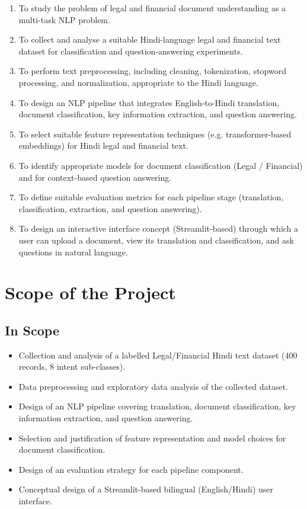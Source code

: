 \begin{enumerate}
    \item To study the problem of legal and financial document understanding as a multi-task NLP problem.
    \item To collect and analyse a suitable Hindi-language legal and financial text dataset for classification and question-answering experiments.
    \item To perform text preprocessing, including cleaning, tokenization, stopword processing, and normalization, appropriate to the Hindi language.
    \item To design an NLP pipeline that integrates English-to-Hindi translation, document classification, key information extraction, and question answering.
    \item To select suitable feature representation techniques (e.g. transformer-based embeddings) for Hindi legal and financial text.
    \item To identify appropriate models for document classification (Legal / Financial) and for context-based question answering.
    \item To define suitable evaluation metrics for each pipeline stage (translation, classification, extraction, and question answering).
    \item To design an interactive interface concept (Streamlit-based) through which a user can upload a document, view its translation and classification, and ask questions in natural language.
\end{enumerate}


\section{Scope of the Project}


\subsection{In Scope}

\begin{itemize}
    \item Collection and analysis of a labelled Legal/Financial Hindi text dataset (400 records, 8 intent sub-classes).
    \item Data preprocessing and exploratory data analysis of the collected dataset.
    \item Design of an NLP pipeline covering translation, document classification, key information extraction, and question answering.
    \item Selection and justification of feature representation and model choices for document classification.
    \item Design of an evaluation strategy for each pipeline component.
    \item Conceptual design of a Streamlit-based bilingual (English/Hindi) user interface.
\end{itemize}

